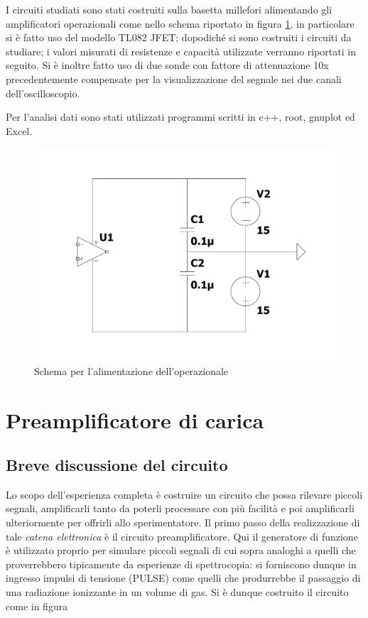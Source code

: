 \documentclass{article}
\begin{document}
I circuiti studiati sono stati costruiti sulla basetta millefori alimentando gli amplificatori operazionali come nello schema riportato 
in figura \ref{fig:alimentazione}, in particolare si è fatto uso del modello TL082 JFET; dopodiché si sono 
costruiti i circuiti da studiare;  i valori misurati di resistenze e capacità utilizzate verranno riportati in seguito.
Si è inoltre fatto uso di due sonde con fattore di attenuazione 10x precedentemente compensate per la visualizzazione del 
segnale nei due canali dell'oscilloscopio.

Per l'analisi dati sono stati utilizzati programmi scritti in c++, root, gnuplot ed Excel.

\begin{center}
\begin{figure}[H]
\centering
\includegraphics[scale=0.1875, angle=0]{alimentazione.pdf}
\caption{ Schema per l'alimentazione dell'operazionale }
\label{fig:alimentazione}
\end{figure}
\end{center} 

\section{Preamplificatore di carica}

\subsection{Breve discussione del circuito}

Lo scopo dell'esperienza completa è costruire un circuito che possa rilevare piccoli segnali, amplificarli tanto da poterli processare con più facilità
e poi amplificarli ulteriormente per offrirli allo sperimentatore. Il primo passo della realizzazione di tale \textit{catena elettronica} è il circuito
preamplificatore. Qui il generatore di funzione è utilizzato proprio per simulare piccoli segnali di cui sopra analoghi a quelli che proverrebbero tipicamente 
da esperienze di spettrocopia: si forniscono dunque in ingresso impulsi di tensione (PULSE) come quelli che produrrebbe il passaggio di una radiazione ionizzante in 
un volume di gas. 
Si è dunque costruito il circuito come in figura
\end{document}
